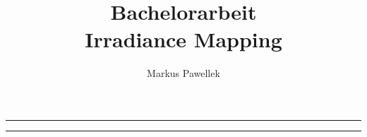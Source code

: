 

\title{Bachelorarbeit \\ Irradiance Mapping}
\author{Markus Pawellek}
\newcommand{\email}{markuspawellek@gmail.com}

\usepackage[mathscr]{euscript}

\newcommand{\ssp}[1][2]{\mathscr{S}^{#1}}
\newcommand{\shs}[2][2]{\mathscr{H}^{#1}_{#2}}

\usepackage{tabularx}

\let\stdsection\section
\renewcommand*\section{\thispagestyle{titlestyle}\stdsection}

\usepackage{emptypage}



	

	\pagestyle{contentstyle}

	\cleardoublepage

	\hrule
	\medskip
	\begin{abstract}
		\itshape
		
	\end{abstract}
	\medskip
	\hrule
	\bigskip

	\tableofcontents

	\cleardoublepage
	\listoffigures

	\cleardoublepage
	

	\cleardoublepage
	\pagestyle{mainstyle}

	\cleardoublepage
	
	\cleardoublepage
	
	\cleardoublepage
	
	\cleardoublepage
	
	\cleardoublepage
	

	\newpage


